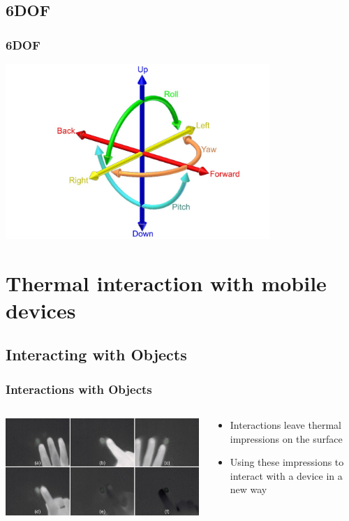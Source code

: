 \documentclass{beamer}
\begin{document}
\subsection{6DOF}
\begin{frame}
	\frametitle{6DOF}
	\includegraphics[width=10cm]{../Sample_paper/images/6DOF_en}
	\begin{center}
	\cite{6DOF}
	\end{center}
\end{frame}

\section[Mobile Thermal Interaction]{Thermal interaction with mobile devices}

\subsection{Interacting with Objects}
\begin{frame}
\frametitle{Interactions with Objects}	
	\begin{columns}
    \begin{column}{0.7\textwidth}
	\includegraphics[width=\textwidth]{images/Thermal}
	
	\cite{Thermal}
	\end{column}
	\begin{column}{0.4\textwidth}
	\begin{itemize}
		\item Interactions leave thermal impressions on the surface
		\item Using these impressions to interact with a device in a new way 
	\end{itemize}	
	\end{column}
    \end{columns}
\end{frame}
\end{document}
